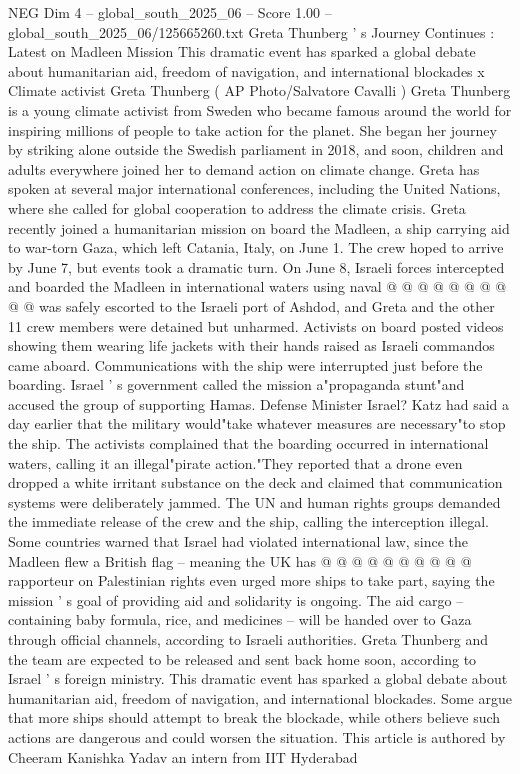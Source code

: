 \begin{textsample}{NEG Dim 4 – global\_south\_2025\_06 – Score 1.00 – global\_south\_2025\_06/125665260.txt}  \label{ex:f4_neg_110}
Greta Thunberg ' s Journey Continues : Latest on Madleen Mission This dramatic event has sparked a global debate about humanitarian aid, freedom of navigation, and international blockades x Climate activist Greta Thunberg ( AP Photo/Salvatore Cavalli ) Greta Thunberg is a young climate activist from Sweden who became famous around the world for inspiring millions of people to take action for the planet.
She began her journey by striking alone outside the Swedish parliament in 2018, and soon, children and adults everywhere joined her to demand action on climate change.
Greta has spoken at several major international conferences, including the United Nations, where she called for global cooperation to address the climate crisis.
Greta recently joined a humanitarian mission on board the Madleen, a ship carrying aid to war-torn Gaza, which left Catania, Italy, on June 1.
The crew hoped to arrive by June 7, but events took a dramatic turn.
On June 8, Israeli forces intercepted and boarded the Madleen in international waters using naval @ @ @ @ @ @ @ @ @ @ was safely escorted to the Israeli port of Ashdod, and Greta and the other 11 crew members were detained but unharmed.
Activists on board posted videos showing them wearing life jackets with their hands raised as Israeli commandos came aboard.
Communications with the ship were interrupted just before the boarding.
Israel ' s government called the mission a"propaganda stunt"and accused the group of supporting Hamas.
Defense Minister Israel?
Katz had said a day earlier that the military would"take whatever measures are necessary"to stop the ship.
The activists complained that the boarding occurred in international waters, calling it an illegal"pirate action."They reported that a drone even dropped a white irritant substance on the deck and claimed that communication systems were deliberately jammed.
The UN and human rights groups demanded the immediate release of the crew and the ship, calling the interception illegal.
Some countries warned that Israel had violated international law, since the Madleen flew a British flag -- meaning the UK has @ @ @ @ @ @ @ @ @ @ rapporteur on Palestinian rights even urged more ships to take part, saying the mission ' s goal of providing aid and solidarity is ongoing.
The aid cargo -- containing baby formula, rice, and medicines -- will be handed over to Gaza through official channels, according to Israeli authorities.
Greta Thunberg and the team are expected to be released and sent back home soon, according to Israel ' s foreign ministry.
This dramatic event has sparked a global debate about humanitarian aid, freedom of navigation, and international blockades.
Some argue that more ships should attempt to break the blockade, while others believe such actions are dangerous and could worsen the situation.
This article is authored by Cheeram Kanishka Yadav an intern from IIT Hyderabad

\end{textsample}

